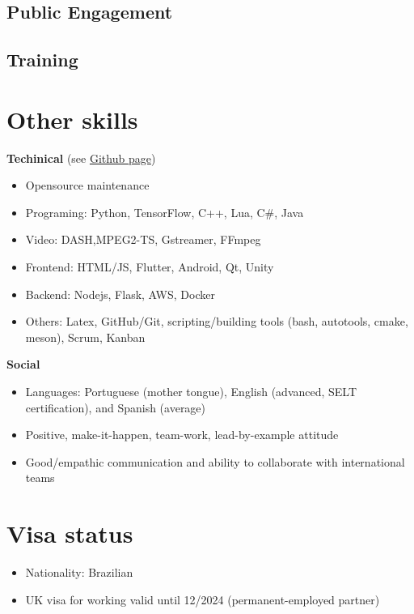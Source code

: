 \documentclass[10pt,a4paper,sans,colorlinks]{moderncv}
\begin{document}
\subsection{Public Engagement}
  
\subsection{Training}

\section{Other skills}

\textbf{Techinical} (see \href{https://github.com/alanlivio}{Github page})
  \begin{itemize}[mynosep]
    \item Opensource maintenance
    \item Programing: Python, TensorFlow, C++, Lua, C\#, Java
    \item Video: DASH,MPEG2-TS, Gstreamer, FFmpeg
    \item Frontend: HTML/JS, Flutter, Android, Qt, Unity
    \item Backend: Nodejs, Flask, AWS, Docker
    \item Others: Latex, GitHub/Git, scripting/building tools (bash, autotools, cmake, meson), Scrum, Kanban
  \end{itemize}
  
\textbf{Social}
  \begin{itemize}[mynosep]
    \item Languages: Portuguese (mother tongue), English (advanced, SELT certification), and Spanish (average)
    \item Positive, make-it-happen, team-work, lead-by-example attitude
    \item Good/empathic communication and ability to collaborate with international teams
  \end{itemize}

\section{Visa status}
  \begin{itemize}[mynosep]
    \item Nationality: Brazilian
    \item UK visa for working valid until 12/2024 (permanent-employed partner)
  \end{itemize}
\end{document}

